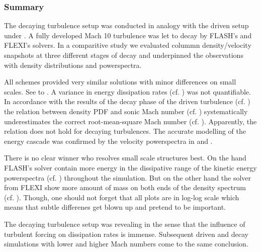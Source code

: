 % 

\subsubsection{Summary}
The decaying turbulence setup was conducted in analogy with the driven
setup under . A fully developed Mach 10 turbulence was
let to decay by FLASH's and FLEXI's solvers. In a comparitive study
we evaluated colummn density/velocity snapshots at three different
stages of decay and underpinned the observations with density
distributions and powerspectra.

All schemes provided very similar solutions with minor differences on small
scales. See  to
.  A variance in energy dissipation rates
(cf. ) was not quantifiable.  In accordance
with the results of the decay phase of the driven turbulence (cf.
) the relation between density PDF and sonic Mach number (cf.
) systematically underestimates the correct
root-mean-square Mach number (cf.
). Apparently, the relation does
not hold for decaying turbulences. The accurate modelling of the energy cascade
was confirmed by the velocity powerspectra in
 and
.

There is no clear winner who resolves small scale structures best.  On the
hand FLASH's solver contain more energy in the dissipative range of the kinetic
energy powerspectra (cf. ) throughout
the simulation. But on the other hand the solver from FLEXI show more amount of
mass on both ends of the density spectrum (cf.
). Though, one should not forget that
all plots are in log-log scale which means that subtle differenes get blown
up and pretend to be important.

The decaying turbulence setup was revealing in the sense that the influence of
turbulent forcing on dissipation rates is immense. Subsequent driven and decay
simulations with lower and higher Mach numbers come to the same conclusion.
